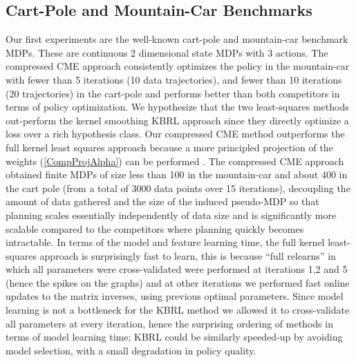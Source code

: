 \documentclass[letterpaper]{article}
\begin{document}
\subsection{Cart-Pole and Mountain-Car Benchmarks}

Our first experiments are the well-known cart-pole and mountain-car benchmark MDPs. These are continuous 2 dimensional state MDPs with 3 actions. The compressed CME approach consistently optimizes the policy in the mountain-car with fewer than 5 iterations (10 data trajectories), and fewer than 10 iterations (20 trajectories) in the cart-pole and performs better than both competitors in terms of policy optimization. We hypothesize that the two least-squares methods out-perform the kernel smoothing KBRL approach since they directly optimize a loss over a rich hypothesis class. Our compressed CME method outperforms the full kernel least squares approach because a more principled projection of the weights (\ref{CompProjAlpha}) can be performed . The compressed CME approach obtained finite MDPs of size less than 100 in the mountain-car and about 400 in the cart pole (from a total of 3000 data points over 15 iterations), decoupling the amount of data gathered and the size of the induced pseudo-MDP so that planning scales essentially independently of data size and is significantly more scalable compared to the competitors where planning quickly becomes intractable. In terms of the model and feature learning time, the full kernel least-squares approach is surprisingly fast to learn, this is because ``full relearns'' in which all parameters were cross-validated were performed at iterations 1,2 and 5 (hence the spikes on the graphs) and at other iterations we performed fast online updates to the matrix inverses, using previous optimal parameters. Since model learning is not a bottleneck for the KBRL method we allowed it to cross-validate all parameters at every iteration, hence the surprising ordering of methods in terms of model learning time; KBRL could be similarly speeded-up by avoiding model selection, with a small degradation in policy quality.
\end{document}
